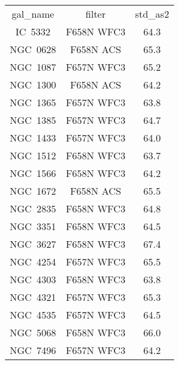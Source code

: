 \begin{table}
\begin{tabular}{ccc}
gal_name & filter & std_as2 \\
IC~5332 & F658N WFC3 & 64.3 \\
NGC~0628 & F658N ACS & 65.3 \\
NGC~1087 & F657N WFC3 & 65.2 \\
NGC~1300 & F658N ACS & 64.2 \\
NGC~1365 & F657N WFC3 & 63.8 \\
NGC~1385 & F657N WFC3 & 64.7 \\
NGC~1433 & F657N WFC3 & 64.0 \\
NGC~1512 & F658N WFC3 & 63.7 \\
NGC~1566 & F658N WFC3 & 64.2 \\
NGC~1672 & F658N ACS & 65.5 \\
NGC~2835 & F658N WFC3 & 64.8 \\
NGC~3351 & F658N WFC3 & 64.5 \\
NGC~3627 & F658N WFC3 & 67.4 \\
NGC~4254 & F657N WFC3 & 65.5 \\
NGC~4303 & F658N WFC3 & 63.8 \\
NGC~4321 & F657N WFC3 & 65.3 \\
NGC~4535 & F657N WFC3 & 64.5 \\
NGC~5068 & F658N WFC3 & 66.0 \\
NGC~7496 & F657N WFC3 & 64.2 \\
\end{tabular}
\end{table}
